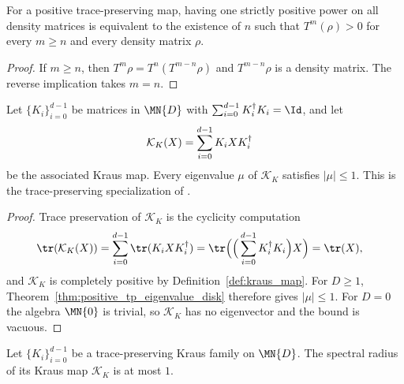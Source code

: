 \begin{theorem}
    \label{thm:wolf_primitive_uniform_eventual}
    \leanok
    For a positive trace-preserving map, having one strictly positive power
    on all density matrices is equivalent to the existence of $n$ such that
    $T^m(\rho)>0$ for every $m\geq n$ and every density matrix $\rho$.
\end{theorem}
\begin{proof}\leanok
    If $m\geq n$, then $T^m\rho=T^n(T^{m-n}\rho)$ and
    $T^{m-n}\rho$ is a density matrix. The reverse implication takes $m=n$.
\end{proof}

\begin{theorem}%
    \label{thm:kraus_tp_eigenvalue_bound}
    \leanok
    Let $\{K_i\}_{i=0}^{d-1}$ be matrices in $\MN{D}$ with
    $\sum_{i=0}^{d-1}K_i^\dagger K_i=\Id$, and let
    \begin{align}
        \mathcal K_K(X)
         & =\sum_{i=0}^{d-1}K_iXK_i^\dagger
        \notag
    \end{align}
    be the associated Kraus map. Every eigenvalue $\mu$ of $\mathcal K_K$
    satisfies $|\mu| \le 1$.
    This is the trace-preserving specialization of
    \cite[Proposition~6.1]{Wolf2012Quantum}.
\end{theorem}

\begin{proof}\leanok
    Trace preservation of $\mathcal K_K$ is the cyclicity computation
    \begin{align}
        \tr(\mathcal K_K(X))
         & =\sum_{i=0}^{d-1}\tr(K_iXK_i^\dagger)
          =\tr\Big(\Big(\sum_{i=0}^{d-1}K_i^\dagger K_i\Big)X\Big)
          =\tr(X),
        \notag
    \end{align}
    and $\mathcal K_K$ is completely positive by
    Definition~\ref{def:kraus_map}. For $D\geq1$,
    Theorem~\ref{thm:positive_tp_eigenvalue_disk} therefore gives
    $|\mu|\leq1$. For $D=0$ the algebra $\MN{0}$ is trivial, so
    $\mathcal K_K$ has no eigenvector and the bound is vacuous.
\end{proof}

\begin{theorem}%
    \label{thm:kraus_tp_spectral_radius_bound}
    \leanok
    Let $\{K_i\}_{i=0}^{d-1}$ be a trace-preserving Kraus family on $\MN{D}$.
    The spectral radius of its Kraus map $\mathcal K_K$ is at most $1$.
\end{theorem}

